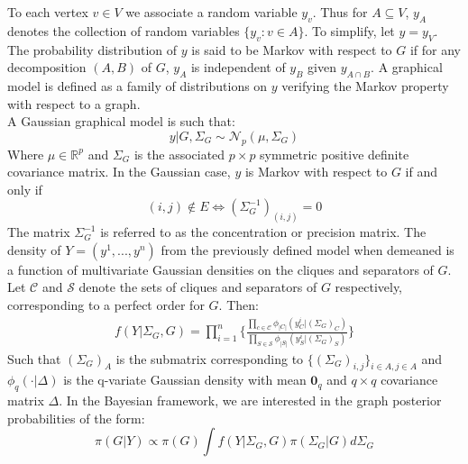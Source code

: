 To each vertex $v \in V$ we associate a random variable $y_v$. Thus for $A \subseteq V$, $y_A$ denotes the collection of random variables $\{y_v : v\in A\}$. To simplify, let $y = y_V$. The probability distribution of $y$ is said to be Markov with respect to $G$ if for any decomposition $(A,B)$ of $G$, $y_A$ is independent of $y_B$ given $y_{A\cap B}$. A graphical model is defined as a family of distributions on $y$ verifying the Markov property with respect to a graph.\\
A Gaussian graphical model is such that:
\begin{equation*}
    y|G, \Sigma_G \sim \mathcal{N}_p(\mu, \Sigma_G)
\end{equation*}
Where $\mu \in \mathbb{R}^p$ and $\Sigma_G$ is the associated $p\times p$ symmetric positive definite covariance matrix. In the Gaussian case, $y$ is Markov with respect to $G$ if and  only if 
\begin{equation*}
    (i,j) \not\in E \iff (\Sigma_G^{-1})_{(i,j)} =0
\end{equation*}
The matrix $\Sigma_G^{-1}$ is referred to as the concentration or precision matrix. The density of $Y = (y^1,...,y^n)$ from the previously defined model when demeaned is a function of multivariate Gaussian densities on the cliques and separators of $G$. Let $\mathcal{C}$ and $\mathcal{S}$ denote the sets of cliques and separators of $G$ respectively, corresponding to a perfect order for $G$. Then:
\begin{equation*}
    \begin{gathered}
        f(Y|\Sigma_G,G) = \prod_{i=1}^n \{\frac{\prod_{c\in\mathcal{C} }\phi_{|C|}(y_C^i | (\Sigma_G)_C)}{\prod_{S\in \mathcal{S}}\phi_{|S|} (y_S^i | (\Sigma_G)_S)}\}
    \end{gathered}
\end{equation*}
Such that $(\Sigma_G)_A$ is the submatrix corresponding to $\{(\Sigma_G)_{i,j}\}_{i\in A, j \in A}$ and $\phi_q(\cdot| \Delta)$ is the q-variate Gaussian density with mean $\mathbf{0}_q$ and $q\times q$ covariance matrix $\Delta$. In the Bayesian framework, we are interested in the graph posterior probabilities of the form:
\begin{equation*}
    \pi(G | Y) \propto \pi (G) \int f(Y|\Sigma_G , G) \pi(\Sigma_G|G)d\Sigma_G
\end{equation*}

